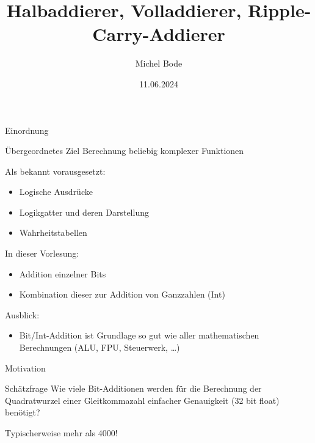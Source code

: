 \documentclass[aspectratio=169]{beamer}
\title{Halbaddierer, Volladdierer, Ripple-Carry-Addierer}
\author{Michel Bode}
\date{11.06.2024}
\begin{document}
	
	\begin{frame}
		\titlepage 
	\end{frame}
	
	\begin{frame}{Einordnung}

		\begin{block}{Übergeordnetes Ziel}
			Berechnung beliebig komplexer Funktionen 
		\end{block}
		
		Als bekannt vorausgesetzt:
		\begin{itemize}
			\item Logische Ausdrücke
			\item Logikgatter und deren Darstellung
			\item Wahrheitstabellen
		\end{itemize}

		In dieser Vorlesung:
		\begin{itemize}
			\item Addition einzelner Bits
			\item Kombination dieser zur Addition von Ganzzahlen (Int)
		\end{itemize}

		Ausblick:
		\begin{itemize}
			\item Bit/Int-Addition ist Grundlage so gut wie aller mathematischen Berechnungen (ALU, FPU, Steuerwerk, \dots)
		\end{itemize}
		
	\end{frame}

	\begin{frame}{Motivation}

		\begin{block}{Schätzfrage}
			Wie viele Bit-Additionen werden für die Berechnung der Quadratwurzel einer Gleitkommazahl einfacher Genauigkeit (32 bit float) benötigt?

			\uncover<2->
			{
				\begin{center}
					Typischerweise mehr als 4000!
				\end{center} 	
			}
		\end{block}
		
	\end{frame}
\end{document}
